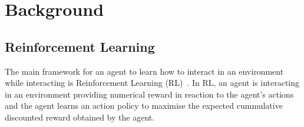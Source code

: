 \documentclass[letterpaper]{article} %
\begin{document}

\section{Background}
\subsection{Reinforcement Learning}

The main framework for an agent to learn how to interact in an environment while
interacting is Reinforcement 
Learning (RL)~\cite{kober2013reinforcement,sutton1998reinforcement}. In RL, an
agent is interacting in an environment
providing numerical reward in reaction to the agent's actions and
the agent learns an action policy to maximise the expected cummulative discounted
reward obtained by the agent.
\end{document}
